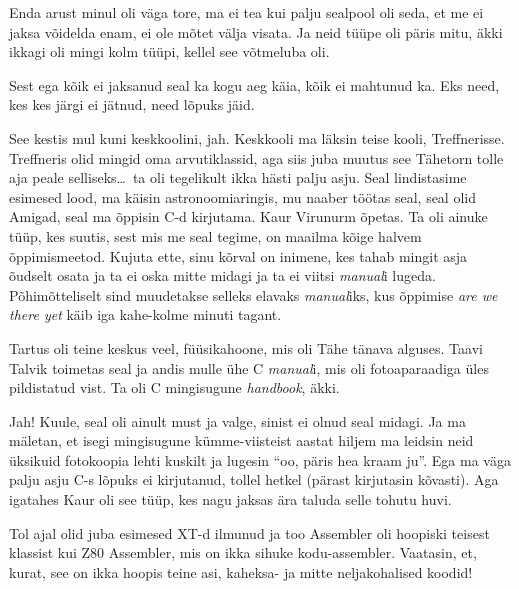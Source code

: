 
Enda arust minul oli väga tore, ma ei tea kui palju sealpool oli seda, et me ei 
jaksa võidelda enam, ei ole mõtet välja visata. Ja neid tüüpe oli päris mitu, 
äkki ikkagi oli mingi kolm tüüpi, kellel see võtmeluba  oli. 


Sest ega kõik ei jaksanud seal ka kogu aeg käia, kõik ei mahtunud ka. Eks need, 
kes  kes järgi ei jätnud, need lõpuks jäid. 


See kestis mul kuni keskkoolini, jah. Keskkooli ma läksin teise kooli, 
Treffnerisse. Treffneris olid  mingid 
oma arvutiklassid, aga siis juba  muutus see Tähetorn 
tolle aja peale selliseks\ldots\ ta oli tegelikult ikka hästi 
palju asju. Seal lindistasime  esimesed lood, ma käisin astronoomiaringis,
mu naaber töötas seal, seal olid Amigad, seal ma õppisin 
C-d kirjutama. Kaur Virunurm õpetas. 
Ta oli ainuke tüüp, kes suutis, sest mis me seal tegime, on maailma kõige halvem 
õppimismeetod. Kujuta ette, sinu kõrval on inimene, kes tahab mingit asja 
õudselt osata ja ta ei oska mitte midagi ja ta ei viitsi \emph{manual}i 
lugeda. Põhimõtteliselt sind muudetakse selleks elavaks \emph{manual}iks, kus 
õppimise \emph{are we there yet} käib iga kahe-kolme minuti tagant.

Tartus oli teine keskus veel, füüsikahoone, mis oli Tähe tänava alguses. Taavi 
Talvik toimetas seal ja andis mulle ühe C 
\emph{manual}i, mis oli fotoaparaadiga üles pildistatud vist. Ta oli C 
mingisugune \emph{handbook}, äkki.


Jah! Kuule, seal oli ainult must ja valge, sinist ei olnud seal midagi. Ja ma 
mäletan, et  isegi mingisugune kümme-viisteist aastat hiljem ma leidsin neid 
üksikuid fotokoopia lehti kuskilt ja lugesin \enquote{oo, päris hea kraam ju}. 
Ega ma väga palju asju C-s lõpuks ei kirjutanud, tollel hetkel 
(pärast kirjutasin kõvasti). Aga igatahes Kaur oli 
see tüüp, kes nagu jaksas ära taluda selle tohutu huvi. 

Tol ajal olid juba esimesed XT-d ilmunud ja too 
Assembler oli hoopiski teisest klassist kui Z80 Assembler, 
mis on ikka sihuke kodu-assembler. Vaatasin, et, kurat, see on ikka hoopis 
teine asi, kaheksa- ja mitte neljakohalised koodid! 

